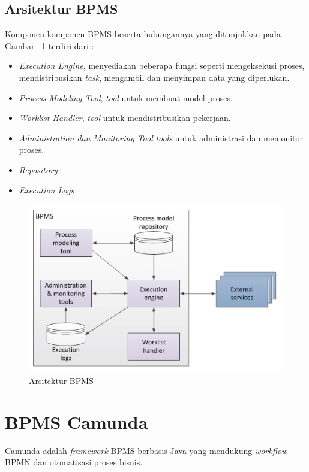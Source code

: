 \subsection{Arsitektur BPMS}
Komponen-komponen BPMS beserta hubungannya yang ditunjukkan pada Gambar ~\ref{fig:arsitekturbpms} terdiri dari :
\begin{itemize}
	\item \textit{Execution Engine}, menyediakan beberapa fungsi seperti mengeksekusi proses, mendistribusikan \textit{task}, mengambil dan menyimpan data yang diperlukan. 
	\item \textit{Process Modeling Tool}, \textit{tool} untuk membuat model proses.
	\item \textit{Worklist Handler}, \textit{tool} untuk mendistribusikan pekerjaan.
	\item \textit{Administration dan Monitoring Tool} \textit{tools} untuk administrasi dan memonitor proses. 
	\item \textit{Repository}
	\item \textit{Execution Logs}
\end{itemize}
\begin{figure}[H]
	\centering
	\includegraphics[scale=0.5]{Gambar/Bab-2/bpms/bpms}
	\caption{Arsitektur BPMS} 
	\label{fig:arsitekturbpms}
\end{figure}



\section{BPMS Camunda}
Camunda adalah \textit{framework} BPMS berbasis Java yang mendukung \textit{workflow} BPMN dan otomatisasi proses bisnis. 

